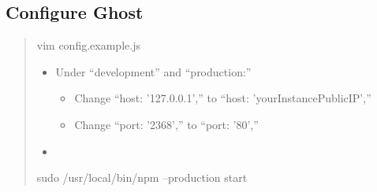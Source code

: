 \documentclass[a4paper]{report}
\begin{document}
    \subsection{Configure Ghost}
      \begin{quotation}
        vim config.example.js
        \begin{itemize}
          \item Under ``development'' and ``production:''
            \begin{itemize}
              \item Change ``host: '127.0.0.1','' to ``host: 'yourInstancePublicIP',''
              \item Change ``port: '2368','' to ``port: '80',''
            \end{itemize}
          \item
        \end{itemize}
        sudo /usr/local/bin/npm --production start
      \end{quotation}
\end{document}
